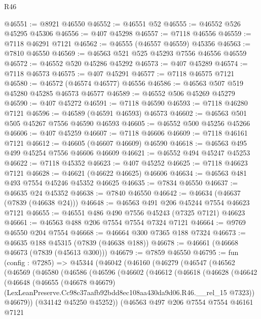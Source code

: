\begin{lexlean}{R46}
\begin{coremodule}
@46551 := @8921 @46550
@46552 := @46551 @52
@46555 := @46552 @526 @45295 @45306
@46556 := @407 @45298
@46557 := @7118 @46556
@46559 := @7118 @46291 @7121
@46562 := @46555 (@46557 @46559) @45356
@46563 := @7810 @46550
@46569 := @46563 @521 @525 @45293 @7556 @46556 @46559
@46572 := @46552 @520 @45286 @45292
@46573 := @407 @45289
@46574 := @7118 @46573
@46575 := @407 @45291
@46577 := @7118 @46575 @7121
@46580 := @46572 (@46574 @46577) @46556
@46586 := @46563 @507 @519 @45280 @45285 @46573 @46577
@46589 := @46552 @506 @45269 @45279
@46590 := @407 @45272
@46591 := @7118 @46590
@46593 := @7118 @46280 @7121
@46596 := @46589 (@46591 @46593) @46573
@46602 := @46563 @501 @505 @45267 @7556 @46590 @46593
@46605 := @46552 @500 @45256 @45266
@46606 := @407 @45259
@46607 := @7118 @46606
@46609 := @7118 @46161 @7121
@46612 := @46605 (@46607 @46609) @46590
@46618 := @46563 @495 @499 @45254 @7556 @46606 @46609
@46621 := @46552 @494 @45247 @45253
@46622 := @7118 @45352
@46623 := @407 @45252
@46625 := @7118 @46623 @7121
@46628 := @46621 (@46622 @46625) @46606
@46634 := @46563 @481 @493 @7554 @45246 @45352 @46625
@46635 := @7834 @46550
@46637 := @46635 @24 @45352
@46638 := @7840 @46550
@46642 := @46634 (@46637 (@7839 (@46638 @24)))
@46648 := @46563 @491 @206 @45244 @7554 @46623 @7121
@46655 := @46551 @486 @490 @7556 @45243 (@7325 @7121) @46623
@46661 := @46563 @488 @206 @7554 @7554 @7324 @7121
@46664 := @9769 @46550 @204 @7554
@46668 := @46664 @300 @7365 @188 @7324
@46673 := @46635 @188 @45315 (@7839 (@46638 @188))
@46678 := @46661 (@46668 @46673 (@7839 (@45613 @300)))
@46679 := @7859 @46550
@46795 := fun (config : @7285) =>
  @45344
    (@46042
      (@46160
        (@46279
          (@46547
            (@46562
              (@46569
                (@46580
                  (@46586
                    (@46596
                      (@46602
                        (@46612
                          (@46618
                            (@46628
                              (@46642
                                (@46648
                                  (@46655
                                    (@46678 @46679)
                                    (LexLeanPreserve.Cc98c37aafb92bdd8ec108aa430da9d06.R46.__rel_15
                                      @7323))
                                  @46679))
                              (@34142 @45250 @45252))
                            (@46563
                              @497
                              @206
                              @7554
                              @7554
                              @46161
                              @7121

\end{coremodule}
\end{lexlean}
